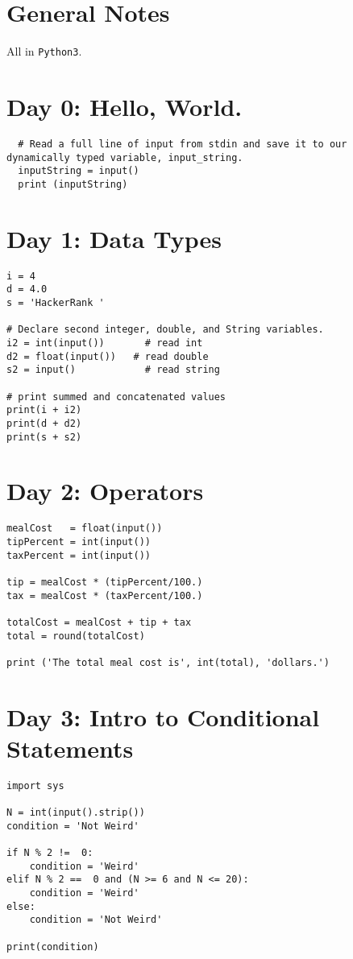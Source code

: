 \documentclass[11pt,a4paper]{article}
\begin{document}
\section*{General Notes}
All in {\tt Python3}. 

\newpage
\section{Day 0: Hello, World.}
\begin{lstlisting}
  # Read a full line of input from stdin and save it to our dynamically typed variable, input_string.
  inputString = input()
  print (inputString)
\end{lstlisting}

\newpage
\section{Day 1: Data Types}
\begin{lstlisting}
i = 4
d = 4.0
s = 'HackerRank '

# Declare second integer, double, and String variables.
i2 = int(input())       # read int
d2 = float(input())   # read double 
s2 = input()            # read string

# print summed and concatenated values
print(i + i2)
print(d + d2)
print(s + s2)
\end{lstlisting}

\newpage
\section{Day 2: Operators}
\begin{lstlisting}
mealCost   = float(input()) 
tipPercent = int(input())   
taxPercent = int(input()) 

tip = mealCost * (tipPercent/100.)
tax = mealCost * (taxPercent/100.)

totalCost = mealCost + tip + tax
total = round(totalCost)

print ('The total meal cost is', int(total), 'dollars.')
\end{lstlisting}


\newpage
\section{Day 3: Intro to Conditional Statements}
\begin{lstlisting}
import sys

N = int(input().strip())
condition = 'Not Weird' 

if N % 2 !=  0:
    condition = 'Weird'
elif N % 2 ==  0 and (N >= 6 and N <= 20):
    condition = 'Weird'
else:
    condition = 'Not Weird' 

print(condition)        

\end{lstlisting}
\end{document}
